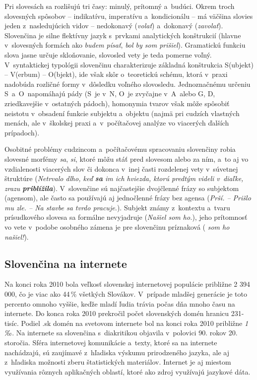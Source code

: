 \begin{multicols}{2}
Pri slovesách sa rozlišujú tri časy: minulý, prítomný a~budúci.
Okrem troch slovesných spôsobov – indikatívu, imperatívu
a~kondicionálu – má väčšina slovies jeden z~nasledujúcich vidov
– nedokonavý (\emph{volať}) a~dokonavý (\emph{zavolať}).
Slovenčina je silne flektívny jazyk s~prvkami analytických
konštrukcií (hlavne v~slovesných formách ako \emph{budem písať},
\emph{bol by som prišiel}). Gramatickú funkciu slova jasne určuje
skloňovanie, slovosled vety je teda pomerne voľný. V~syntaktickej
typológii slovenčinu charakterizuje základná konštrukcia S(ubjekt)
– V(erbum) – O(bjekt), ide však skôr o~teoretickú schému, ktorá
v~praxi nadobúda rozličné formy v~dôsledku voľného slovosledu.
Jednoznačnému určeniu S~a~O~napomáhajú pády (S~je v~N, O~je
zvyčajne v~A~alebo G, D, zriedkavejšie v~ostatných pádoch),
homonymia tvarov však môže spôsobiť neistotu v~obsadení funkcie
subjektu a~objektu (najmä pri cudzích vlastných menách, ale
v~školskej praxi a~v~počítačovej analýze vo viacerých ďalších
prípadoch). 

Osobitné problémy cudzincom a~počítačovému
spracovaniu slovenčiny robia slovesné morfémy
\emph{sa}, \emph{si}, ktoré môžu stáť pred slovesom alebo za ním,
a~to aj vo vzdialenosti viacerých slov či dokonca v~inej časti
rozdelenej vety v~súvetnej štruktúre (\emph{Netrvalo dlho, keď
\textbf{sa} im ich hviezda, ktorú predtým videli v~diaľke, zrazu 
\textbf{priblížila}}). V~slovenčine sú najčastejšie dvojčlenné
frázy so subjektom (agensom), ale často sa používajú aj
jednočlenné frázy bez agensa (\emph{Prší. – Prišlo mu zle. –
Na stavbe sa tvrdo pracuje.}). Subjekt známy z~kontextu a~tvaru
prísudkového slovesa sa formálne nevyjadruje (\emph{Našiel som
ho.}), jeho prítomnosť vo vete v~podobe osobného zámena je pre
slovenčinu príznaková (\emph{ som ho našiel!}).

\subsection{Slovenčina na internete}
Na konci roka 2010 bola veľkosť slovenskej internetovej
populácie približne 2 394 000, čo je viac ako 44\,\% všetkých
Slovákov. V~prípade mladšej generácie je toto percento omnoho
vyššie, keďže mladí ľudia trávia počas dňa mnoho času na
internete. Do konca roka 2010 prekročil počet slovenských domén
hranicu
231-tisíc\cite{f3}.
Podiel .sk domén na svetovom internete bol na konci roka 2010
približne \emph{1\,‰}\cite{f4}. Na internete sa slovenčina s~diakritikou
objavila v~polovici 90. rokov 20. storočia. Sféra internetovej
komunikácie a~texty, ktoré sa na internete nachádzajú, sú
zaujímavé z~hľadiska výskumu prirodzeného jazyka, ale aj
z~hľadiska možnosti zberu štatistických materiálov. Internet je aj
miestom využívania rôznych aplikačných oblastí, ktoré ako zdroj
využívajú jazykové dáta. 


\end{multicols}
